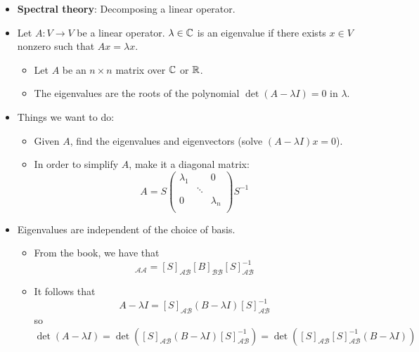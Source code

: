 \documentclass[../../notes.tex]{subfiles}
\begin{document}
\begin{itemize}
    \item \textbf{Spectral theory}: Decomposing a linear operator.
    \item Let $A:V\to V$ be a linear operator. $\lambda\in\mathbb{C}$ is an eigenvalue if there exists $x\in V$ nonzero such that $Ax=\lambda x$.
    \begin{itemize}
        \item Let $A$ be an $n\times n$ matrix over $\mathbb{C}$ or $\mathbb{R}$.
        \item The eigenvalues are the roots of the polynomial $\det(A-\lambda I)=0$ in $\lambda$.
    \end{itemize}
    \item Things we want to do:
    \begin{itemize}
        \item Given $A$, find the eigenvalues and eigenvectors (solve $(A-\lambda I)x=0$).
        \item In order to simplify $A$, make it a diagonal matrix:
        \begin{equation*}
            A = S
            \begin{pmatrix}
                \lambda_1 &  & 0\\
                 & \ddots & \\
                0 &  & \lambda_n\\
            \end{pmatrix}
            S^{-1}
        \end{equation*}
    \end{itemize}
    \item Eigenvalues are independent of the choice of basis.
    \begin{itemize}
        \item From the book, we have that
        \begin{equation*}
            [A]_{\mathcal{A}\mathcal{A}} = [S]_{\mathcal{A}\mathcal{B}}[B]_{\mathcal{B}\mathcal{B}}[S]_{\mathcal{A}\mathcal{B}}^{-1}
        \end{equation*}
        \item It follows that
        \begin{equation*}
            A-\lambda I = [S]_{\mathcal{A}\mathcal{B}}(B-\lambda I)[S]_{\mathcal{A}\mathcal{B}}^{-1}
        \end{equation*}
        so
        \begin{equation*}
            \det(A-\lambda I) = \det([S]_{\mathcal{A}\mathcal{B}}(B-\lambda I)[S]_{\mathcal{A}\mathcal{B}}^{-1})
            = \det([S]_{\mathcal{A}\mathcal{B}}[S]_{\mathcal{A}\mathcal{B}}^{-1}(B-\lambda I))

\end{equation*}
\end{itemize}
\end{itemize}
\end{document}
